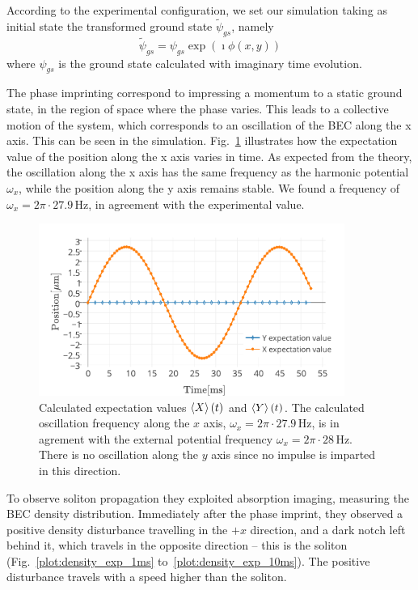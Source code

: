 According to the experimental configuration, we set our simulation taking as initial state the transformed ground state $\tilde{\psi}_{gs}$, namely
\begin{equation}
\tilde{\psi}_{gs} = \psi_{gs} \exp(\imath \phi(x,y))
\end{equation}
where $\psi_{gs}$ is the ground state calculated with imaginary time evolution.

The phase imprinting correspond to impressing a momentum to a static ground state, in the region of space where the phase varies. This leads to a collective motion of the system, which corresponds to an oscillation of the BEC along the x axis. This can be seen in the simulation. Fig.~\ref{plot:oscillation} illustrates how the expectation value of the position along the x axis varies in time. As expected from the theory, the oscillation along the x axis has the same frequency as the harmonic potential $\omega_x$, while the position along the y axis remains stable. We found a frequency of $\omega_x = 2 \pi \cdot 27.9 \, \mathrm{Hz}$, in agreement with the experimental value.
\begin{figure}[t]
    \centering
	\includegraphics[width=10cm]{Plots/oscillation.pdf}
	\caption{Calculated expectation values $\braket{X}(t)$ and $\braket{Y}(t)$. The calculated oscillation frequency along the $x$ axis, $\omega_x = 2 \pi \cdot 27.9 \, \mathrm{Hz}$, is in agrement with the external potential frequency $\omega_x = 2 \pi \cdot 28 \, \mathrm{Hz}$. There is no oscillation along the $y$ axis since no impulse is imparted in this direction.} \label{plot:oscillation}
\end{figure}

To observe soliton propagation they exploited absorption imaging, measuring the BEC density distribution. Immediately after the phase imprint, they observed a positive  density disturbance travelling in the $+x$ direction, and a dark notch left behind it, which travels in the opposite direction -- this is the soliton (Fig.~\ref{plot:density_exp_1ms} to~\ref{plot:density_exp_10ms}). The positive disturbance travels with a speed higher than the soliton.

